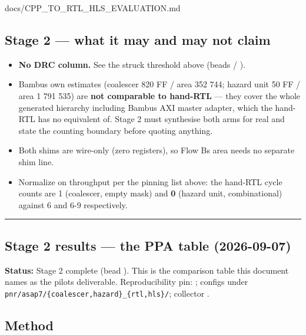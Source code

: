 \begin{relocated}{docs/CPP_TO_RTL_HLS_EVALUATION.md}
\subsection{Stage 2 --- what it may and may not claim}\label{tm:dec:cpp-to-rtl-hls-evaluation:stage-2-what-it-may-and-may-not-claim}

\begin{itemize}
\tightlist
\item
  \textbf{No DRC column.} See the struck threshold above (beads
   / ).
\item
  Bambu\textquotesingle s own estimates (coalescer 820 FF / area 352
  744; hazard unit 50 FF / area 1 791 535) are \textbf{not comparable to
  hand-RTL} --- they cover the whole generated hierarchy including
  Bambu\textquotesingle s AXI master adapter, which the hand-RTL has no
  equivalent of. Stage 2 must synthesise both arms for real and state
  the counting boundary before quoting anything.
\item
  Both shims are wire-only (zero registers), so Flow B\textquotesingle s
  area needs no separate shim line.
\item
  Normalize on throughput per the pinning list above: the hand-RTL cycle
  counts are 1 (coalescer, empty mask) and \textbf{0} (hazard unit,
  combinational) against 6 and 6-9 respectively.
\end{itemize}

\begin{center}\rule{0.5\linewidth}{0.5pt}\end{center}

\subsection{Stage 2 results --- the PPA table (2026-09-07)}\label{tm:dec:cpp-to-rtl-hls-evaluation:stage-2-results-the-ppa-table-2026-09-07}

\textbf{Status:} Stage 2 complete (bead ). This is the
comparison table this document names as the pilot\textquotesingle s
deliverable. Reproducibility pin: ; configs
under
\texttt{pnr/\allowbreak{}asap7/\allowbreak{}\{coalescer,\allowbreak{}hazard\}\_\allowbreak{}\{rtl,\allowbreak{}hls\}/\allowbreak{}};
collector .

\subsection{Method}\label{tm:dec:cpp-to-rtl-hls-evaluation:method}


\end{relocated}
